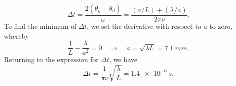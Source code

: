 \documentclass[../TST.tex]{subfiles}
\begin{document}
\begin{equation*}
	\Delta t = \frac{2(\theta_g+\theta_d)}{\omega}= \boxed{\frac{(a/L)+(\lambda/a)}{2\pi\nu}.}
\end{equation*}
To find the minimum of $\Delta t$, we set the derivative with respect to $a$ to zero, whereby
\begin{equation*}
	\frac{1}{L}-\frac{\lambda}{a^2}=0 \quad\Rightarrow\quad \boxed{a=\sqrt{\lambda L}=\qty{7.1}{mm}.}
\end{equation*}
Returning to the expression for $\Delta t$, we have
\begin{equation*}
 \boxed{\Delta t = \frac{1}{\pi\nu}\sqrt{\frac{\lambda}{L}}=\qty{1.4e-6}{s}.}
\end{equation*}

\fi
\ifprob 
	\clearpage
\else 
	\vspace*{5mm}
\fi
\end{document}
